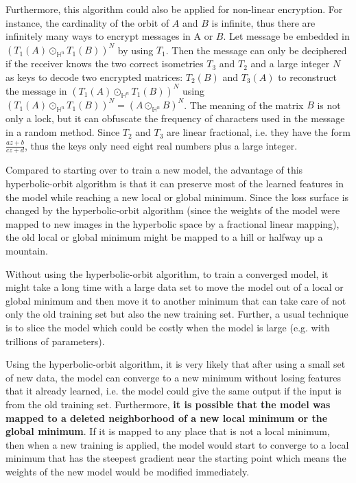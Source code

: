 \documentclass{article}
\theoremstyle{plain}
\theoremstyle{plain} %
\theoremstyle{definition}  %
\theoremstyle{remark}  %
\theoremstyle{plain}
\begin{document}
Furthermore, this algorithm could also be applied for non-linear encryption. For instance, the cardinality of the orbit of $A$ and $B$ is infinite, thus there are infinitely many ways to encrypt messages in A or $B$. Let message be embedded in $(T_1(A)\odot_{\mathbb{H}^n}T_1(B))^N$ by using $T_1$. Then the message can only be deciphered if the receiver knows the two correct isometries $T_3$ and $T_2$ and a large integer $N$ as keys to decode two encrypted matrices: $T_2(B)$ and $T_3(A)$ to reconstruct the message in $(T_1(A)\odot_{\mathbb{H}^n}T_1(B))^N$ using $(T_1(A)\odot_{\mathbb{H}^n}T_1(B))^N = (A\odot_{\mathbb{H}^n}B)^N$. The meaning of the matrix $B$ is not only a lock, but it can obfuscate the frequency of characters used in the message in a random method. Since $T_2$ and $T_3$ are linear fractional, i.e. they have the form $\frac{az+b}{cz+d}$, thus the keys only need eight real numbers plus a large integer.

Compared to starting over to train a new model, the advantage of this hyperbolic-orbit algorithm is that it can preserve most of the learned features in the model while reaching a new local or global minimum. Since the loss surface is changed by the hyperbolic-orbit algorithm (since the weights of the model were mapped to new images in the hyperbolic space by a fractional linear mapping), the old local or global minimum might be mapped to a hill or halfway up a mountain.

Without using the hyperbolic-orbit algorithm, to train a converged model, it might take a long time with a large data set to move the model out of a local or global minimum and then move it to another minimum that can take care of not only the old training set but also the new training set. Further, a usual technique is to slice the model\cite{zhang2022toward} which could be costly when the model is large (e.g. with trillions of parameters).

Using the hyperbolic-orbit algorithm, it is very likely that after using a small set of new data, the model can converge to a new minimum without losing features that it already learned, i.e. the model could give the same output if the input is from the old training set. Furthermore, \textbf{it is possible that the model was mapped to a deleted neighborhood of a new local minimum or the global minimum}. If it is mapped to any place that is not a local minimum, then when a new training is applied, the model would start to converge to a local minimum that has the steepest gradient near the starting point which means the weights of the new model would be modified immediately.
\end{document}
